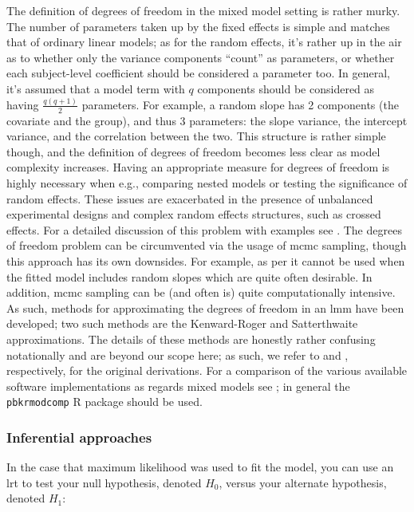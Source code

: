 \documentclass{report}
\begin{document}
The definition of degrees of freedom in the mixed model setting is rather murky. The number of parameters taken up by the fixed effects is simple and matches that of ordinary linear models; as for the random effects, it's rather up in the air as to whether only the variance components ``count'' as parameters, or whether each subject-level coefficient should be considered a parameter too. In general, it's assumed that a model term with $q$ components should be considered as having $\frac{q(q+1)}{2}$ parameters. For example, a random slope has 2 components (the covariate and the group), and thus 3 parameters: the slope variance, the intercept variance, and the correlation between the two. This structure is rather simple though, and the definition of degrees of freedom becomes less clear as model complexity increases. Having an appropriate measure for degrees of freedom is highly necessary when e.g., comparing nested models or testing the significance of random effects. These issues are exacerbated in the presence of unbalanced experimental designs and complex random effects structures, such as crossed effects. For a detailed discussion of this problem with examples see \cite{baayen_mixed-effects_2008}. The degrees of freedom problem can be circumvented via the usage of \gls{mcmc} sampling, though this approach has its own downsides. For example, as per \cite{luke_evaluating_2017} it cannot be used when the fitted model includes random slopes which are quite often desirable. In addition, \gls{mcmc} sampling can be (and often is) quite computationally intensive. As such, methods for approximating the degrees of freedom in an \gls{lmm} have been developed; two such methods are the Kenward-Roger and Satterthwaite approximations. The details of these methods are honestly rather confusing notationally and are beyond our scope here; as such, we refer to \cite{kenward_small_1997} and \cite{satterthwaite_approximate_1946}, respectively, for the original derivations. For a comparison of the various available software implementations as regards mixed models see \cite{luke_evaluating_2017}; in general the \texttt{pbkrmodcomp} R package should be used. 

\subsubsection{Inferential approaches}

In the case that maximum likelihood was used to fit the model, you can use an \gls{lrt} to test your null hypothesis, denoted $H_0$, versus your alternate hypothesis, denoted $H_1$:
\end{document}
